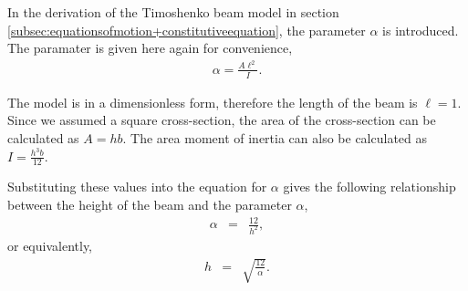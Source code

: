 \documentclass[../../main.tex]{subfiles}
\begin{document}
\begin{figure}[h!]
{{\begin{minipage}[b]{0.8\linewidth}
\begin{center}
				\end{center}
			\end{minipage}
		}
	}
\end{figure}\label{fig:compare:1D+2D}

In the derivation of the Timoshenko beam model in section \ref{subsec:equationsofmotion+constitutiveequation}, the parameter $\alpha$ is 
introduced. The paramater is given here again for convenience,
\begin{eqnarray*}
	\alpha = \frac{A\ell^2}{I}.
\end{eqnarray*}

The model is in a dimensionless form, therefore the length of the beam is $\ell = 1$. Since we assumed a square cross-section, the area of the cross-section can be calculated as $\displaystyle A = hb$. The area moment of inertia can also be calculated as $\displaystyle I = \frac{h^3b}{12}$.

Substituting these values into the equation for $\alpha$ gives the following relationship between the height of the beam and the parameter $\alpha$,
\begin{eqnarray}
	\alpha & = & \frac{12}{h^2}, \label{eq:alpha-h-relationship}
\end{eqnarray}
or equivalently,
\begin{eqnarray}
	h & = & \sqrt{\frac{12}{\alpha}}. \label{eq:h-alpha-relationship}
\end{eqnarray}
\end{document}
